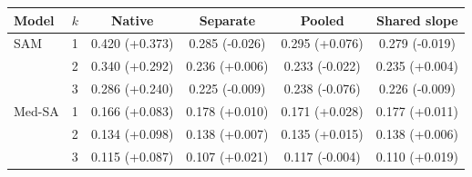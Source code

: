 \begin{tabular}{llcccc}
\toprule
Model & $k$ & Native & Separate & Pooled & Shared slope \\
\midrule
SAM & 1 & 0.420 (+0.373) & 0.285 (-0.026) & 0.295 (+0.076) & 0.279 (-0.019) \\
 & 2 & 0.340 (+0.292) & 0.236 (+0.006) & 0.233 (-0.022) & 0.235 (+0.004) \\
 & 3 & 0.286 (+0.240) & 0.225 (-0.009) & 0.238 (-0.076) & 0.226 (-0.009) \\
\midrule
Med-SA & 1 & 0.166 (+0.083) & 0.178 (+0.010) & 0.171 (+0.028) & 0.177 (+0.011) \\
 & 2 & 0.134 (+0.098) & 0.138 (+0.007) & 0.135 (+0.015) & 0.138 (+0.006) \\
 & 3 & 0.115 (+0.087) & 0.107 (+0.021) & 0.117 (-0.004) & 0.110 (+0.019) \\
\bottomrule
\end{tabular}
